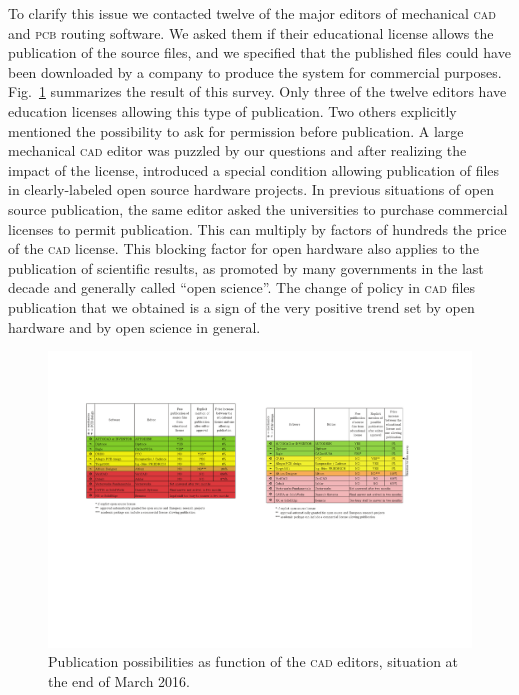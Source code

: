 \documentclass[letterpaper, 10 pt, conference]{ieeeconf}  %
\begin{document}
To clarify this issue we contacted twelve of the major editors of mechanical \textsc{cad} and \textsc{pcb} routing software.
We asked them if their educational license allows the publication of the source files, and we specified that the published files could have been downloaded by a company to produce the system for commercial purposes.
Fig.~\ref{fig:editors} summarizes the result of this survey.
Only three of the twelve editors have education licenses allowing this type of publication. 
Two others explicitly mentioned the possibility to ask for permission before publication.
A large mechanical \textsc{cad} editor was puzzled by our questions and after realizing the impact of the license, introduced a special condition allowing publication of files in clearly-labeled open source hardware projects.
In previous situations of open source publication, the same editor asked the universities to purchase commercial licenses to permit publication.
This can multiply by factors of hundreds the price of the \textsc{cad} license.
This blocking factor for open hardware also applies to the publication of scientific results, as promoted by many governments in the last decade and generally called ``open science''.
The change of policy in \textsc{cad} files publication that we obtained is a sign of the very positive trend set by open hardware and by open science in general.

\begin{figure}
\centering
\includegraphics[width=\columnwidth]{figures/table}
\caption{Publication possibilities as function of the \textsc{cad} editors, situation at the end of March 2016.}
\label{fig:editors}
\end{figure}
\end{document}
